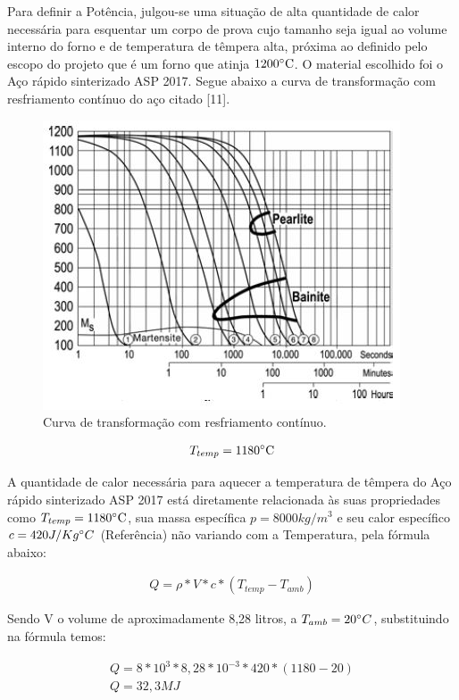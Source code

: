 Para definir a Potência, julgou-se uma situação de alta quantidade de calor necessária para esquentar um corpo de prova cujo tamanho seja igual ao volume interno do forno e de temperatura de têmpera alta, próxima ao definido pelo escopo do projeto que é um forno que atinja $1200 \degree \text{C}$. O material escolhido foi o Aço rápido sinterizado ASP 2017. Segue abaixo a curva de transformação com resfriamento contínuo do aço citado [11].
\begin{figure}[!ht]
	\centering
	\label{transf_continuo}
	\includegraphics[keepaspectratio=true,scale=0.8]{figuras/transf_continuo.JPG}
	\caption{Curva de transformação com resfriamento contínuo.}
\end{figure}

\begin{gather}
	T_{temp} = 1180 \degree \text{C}
\end{gather}

A quantidade de calor necessária para aquecer a temperatura de têmpera do Aço rápido sinterizado ASP 2017 está diretamente relacionada às suas propriedades como $T_{temp} = 1180 \degree \text{C}$, sua massa específica $p = 8000 kg/m^{3}$ e seu calor específico $c = 420 J/Kg \degree C$ (Referência) não variando com a Temperatura, pela fórmula abaixo:

\begin{gather}
	Q = \rho * V * c * (T_{temp} - T_{amb})
\end{gather}

Sendo V o volume de aproximadamente 8,28 litros, a $T_{amb}=20 \degree C$, substituindo na fórmula temos:

\begin{gather}
    Q = 8*10^{3}*8,28*10^{-3}*420*(1180-20) \nonumber \\
    Q = 32,3 MJ \nonumber
\end{gather}

